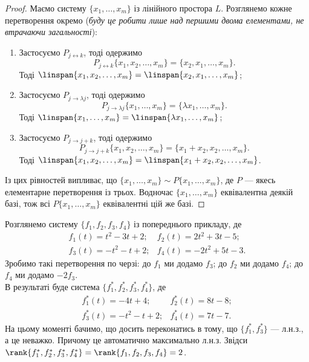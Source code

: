 \documentclass{math_library}
\begin{document}
	\begin{proof}
	Маємо систему $\{x_1,\dots,x_m\}$ із лінійного простора $L$. Розглянемо кожне перетворення окремо (\textit{буду це робити лише над першими двома елементами, не втрачаючи загальності}):
	\begin{enumerate}[nosep,wide=0pt,label={\Roman*.}]
	\item Застосуємо $P_{j \leftrightarrow k}$, тоді одержимо 
	\[
	P_{j \leftrightarrow k} \{x_1,x_2,\dots,x_m\} = \{x_2,x_1,\dots,x_m\}.
	\]
	Тоді $\linspan\{x_1,x_2,\dots,x_m\} = \linspan\{x_2,x_1,\dots,x_m\}$;
	
	\item Застосуємо $P_{j \to \lambda j}$, тоді одержимо 
	\[
	P_{j \to \lambda j} \{x_1,\dots,x_m\} = \{\lambda x_1,\dots,x_m \}.
	\]
	Тоді $\linspan\{x_1,\dots,x_m\} = \linspan\{\lambda x_1,\dots,x_m\}$;
	
	\item Застосуємо $P_{j \to j+k}$, тоді одержимо
	\[P_{j \to j+k} \{x_1,x_2,\dots,x_m\} = \{x_1+x_2,x_2,\dots,x_m\}.
	\]
	Тоді $\linspan\{x_1,x_2,\dots,x_m\} = \linspan\{x_1+x_2,x_2,\dots,x_m\}$.
	\end{enumerate}
	Із цих рівностей випливає, що $\{x_1,\dots,x_m\} \sim P\{x_1,\dots,x_m\}$, де $P$ --- якесь елементарне перетворення із трьох. Водночас $\{x_1,\dots,x_m\}$ еквівалентна деякій базі, тож всі $P\{x_1,\dots,x_m\}$ еквівалентні цій же базі.
	\end{proof}
	
	\begin{example}
	Розглянемо систему $\{f_1,f_2,f_3,f_4\}$ із попереднього прикладу, де
	\[
	\begin{matrix}
	f_1(t) = t^2-3t+2; & f_2(t) = 2t^2+3t-5; \\
	f_3(t) = -t^2-t+2; & f_4(t) = -2t^2+5t-3.
	\end{matrix}
	\]
	Зробимо такі перетворення по черзі: до $f_1$ ми додамо $f_3$; до $f_2$ ми додамо $f_4$; до $f_4$ ми додамо $-2f_3$.\\
	В результаті буде система $\{f_1^*,f_2^*,f_3^*,f_4^*\}$, де
	\[
	\begin{matrix}
	f_1^*(t) = -4t+4; & f_2^*(t) = 8t-8; \\
	f_3^*(t) = -t^2-t+2; & f_4^*(t) = 7t-7.
	\end{matrix}
	\]
	На цьому моменті бачимо, що досить переконатись в тому, що $\{f_1^*,f_3^*\}$ --- л.н.з., а це неважко. Причому це автоматично максимально л.н.з. Звідси $\rank\{f_1^*,f_2^*,f_3^*,f_4^*\} = \rank\{f_1,f_2,f_3,f_4\} = 2$.
	\end{example}
	
\end{document}
